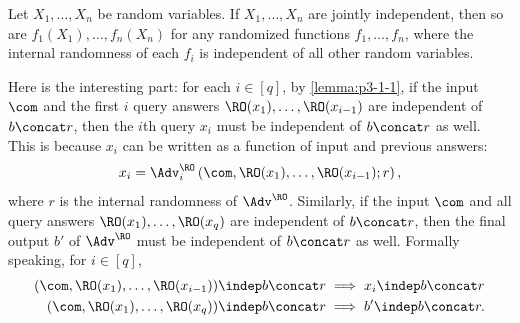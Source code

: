 \begin{answer}[i]
    \begin{lemma}\label{lemma:p3-1-1}
        Let $X_1,\ldots,X_n$ be random variables. If $X_1,\ldots,X_n$  are jointly independent, then so are $f_1(X_1),\ldots, f_n(X_n)$ for any randomized functions $f_1,\ldots, f_n$, where the internal randomness of each $f_i$ is independent of all other random variables.
    \end{lemma}
    
    Here is the interesting part: for each $i\in [q]$, by \autoref{lemma:p3-1-1}, if the input $\com$ and the first $i$ query answers $\RO(x_1), \ldots, \RO(x_{i-1})$ are independent of $b\concat r$, then the $i$th query $x_i$ must be independent of $b\concat r$ as well. This is because $x_{i}$ can be written as a function of input and previous answers:
    \[
        x_{i} = \Adv^\RO_{i}\left(\com, \RO(x_1), \ldots, \RO(x_{i-1}); r\right),
    \]
    where $r$ is the internal randomness of $\Adv^\RO$. 
    Similarly, if the input $\com$ and all query answers $\RO(x_1), \ldots, \RO(x_{q})$ are independent of $b\concat r$, then the final output $b'$ of $\Adv^\RO$ must be independent of $b\concat r$ as well.
    Formally speaking, for $i\in [q]$,
    \begin{align}
        (\com, \RO(x_1), \ldots, \RO(x_{i-1})) \indep b\concat r 
        &\implies x_{i}\indep b\concat r \label{eq:p3-1-2}\\
        (\com, \RO(x_1), \ldots, \RO(x_{q})) \indep b\concat r 
        &\implies b' \indep b\concat r. \label{eq:p3-1-4}
    \end{align}
    


\end{answer}
